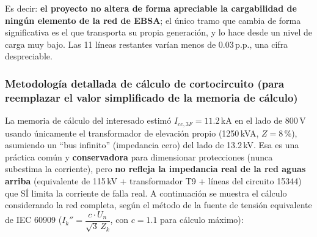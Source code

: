\documentclass[11pt,a4paper]{article}
\begin{document}
Es decir: \textbf{el proyecto no altera de forma apreciable la cargabilidad de ning\'un elemento de la red de EBSA}; el \'unico tramo que cambia de forma significativa es el que transporta su propia generaci\'on, y lo hace desde un nivel de carga muy bajo. Las 11 l\'ineas restantes var\'ian menos de 0.03\,p.p., una cifra despreciable.

\subsubsection*{Metodolog\'ia detallada de c\'alculo de cortocircuito (para reemplazar el valor simplificado de la memoria de c\'alculo)}
\label{sec:metodologia-corto}
La memoria de c\'alculo del interesado estim\'o $I_{cc,3F}=11.2$\,kA en el lado de 800\,V usando \'unicamente el transformador de elevaci\'on propio (1250\,kVA, $Z=8\,\%$), asumiendo un ``bus infinito'' (impedancia cero) del lado de 13.2\,kV. Esa es una pr\'actica com\'un y \textbf{conservadora} para dimensionar protecciones (nunca subestima la corriente), pero \textbf{no refleja la impedancia real de la red aguas arriba} (equivalente de 115\,kV + transformador T9 + l\'ineas del circuito 15344) que S\'I limita la corriente de falla real. A continuaci\'on se muestra el c\'alculo considerando la red completa, seg\'un el m\'etodo de la fuente de tensi\'on equivalente de IEC 60909 ($I_k'' = \dfrac{c \cdot U_n}{\sqrt{3}\, Z_k}$, con $c=1.1$ para c\'alculo m\'aximo):
\end{document}
